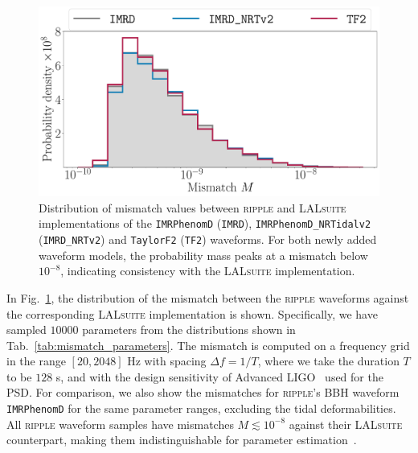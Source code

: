 \documentclass[prd,twocolumn,a4paper,floatfix,nofootinbib,preprintnumbers,superscriptaddress]{revtex4-1}
\begin{document}
\begin{figure}
    \centering
    \vspace{1mm}
\includegraphics[width=\linewidth]{mismatch_histogram.pdf}
    \caption{Distribution of mismatch values between \textsc{ripple} and \textsc{LALsuite} implementations of the \texttt{IMRPhenomD} (\texttt{IMRD}), \texttt{IMRPhenomD\_NRTidalv2} (\texttt{IMRD\_NRTv2}) and \texttt{TaylorF2} (\texttt{TF2}) waveforms. For both newly added waveform models, the probability mass peaks at a mismatch below $10^{-8}$, indicating consistency with the \textsc{LALsuite} implementation.}
    \label{fig:ripple_mismatch}
\end{figure}

In Fig.~\ref{fig:ripple_mismatch}, the distribution of the mismatch between the \textsc{ripple} waveforms against the corresponding \textsc{LALsuite} implementation is shown. Specifically, we have sampled ${10000}$ parameters from the distributions shown in Tab.~\ref{tab:mismatch_parameters}. The mismatch is computed on a frequency grid in the range $[20, 2048]$ Hz with spacing $\Delta f = 1/T$, where we take the duration $T$ to be $128$ s, and with the design sensitivity of Advanced LIGO~\cite{LIGOScientific:2014pky} used for the \ac{PSD}. For comparison, we also show the mismatches for \textsc{ripple}'s \ac{BBH} waveform \texttt{IMRPhenomD} for the same parameter ranges, excluding the tidal deformabilities. All \textsc{ripple} waveform samples have mismatches $M \lesssim 10^{-8}$ against their \textsc{LALsuite} counterpart, making them indistinguishable for parameter estimation~\cite{Purrer:2019jcp}. 
\end{document}
